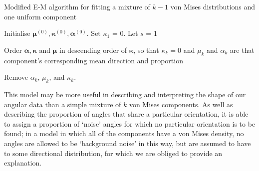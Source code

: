 \documentclass[../../ArchStats.tex]{subfiles}
\begin{document}
\begin{algorithm}[!ht]
    \caption{Modified E-M algorithm for fitting a mixture of $k-1$ von Mises distributions and one uniform component}
	\label{alg:EM-modified}



Initialise $\boldsymbol{\mu}^{(0)}, \boldsymbol{\kappa}^{(0)}, \boldsymbol{\alpha}^{(0)}$. Set $\kappa_1$ = 0. Let $s$ = 1\;


Order $\boldsymbol{\alpha}, \boldsymbol{\kappa}$ and $\boldsymbol{\mu}$ in descending order of $\boldsymbol{\kappa}$, so that $\kappa_k = 0$ and $\mu_k$ and $\alpha_k$ are that component's corresponding mean direction and proportion\;

Remove $\alpha_k$, $\mu_k$, and $\kappa_k$.
\end{algorithm}

This model may be more useful in describing and interpreting the shape of our angular data than  a simple mixture of $k$ von Mises components. As well as describing the proportion of angles that share a particular orientation, it is able to assign a proportion of `noise' angles for which no particular orientation is to be found; in a model in which  all of the components have a von Mises density, no angles are allowed to be `background noise' in this way, but are assumed to have to some directional distribution, for which we are obliged to provide an explanation. 
\end{document}
